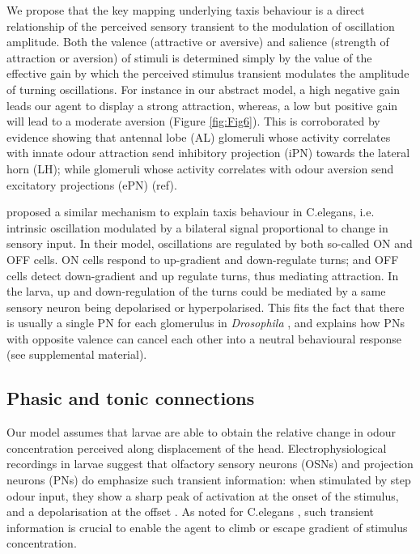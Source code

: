 \documentclass[10pt,a4paper]{article}
\newcommand{\Dros }{\emph{Drosophila }}
\begin{document}
We propose that the key mapping underlying taxis behaviour is a direct relationship of the perceived sensory transient to the modulation of oscillation amplitude.
Both the valence (attractive or aversive) and salience (strength of attraction or aversion) of stimuli is determined simply by the value of the effective gain by which the perceived stimulus transient modulates the amplitude of turning oscillations. For instance in our abstract model, a high negative gain leads our agent to display a strong attraction, whereas, a low but positive gain will lead to a moderate aversion (Figure \ref{fig:Fig6}). This is corroborated by evidence showing that antennal lobe (AL) glomeruli whose activity correlates with innate odour attraction send inhibitory projection (iPN) towards the lateral horn (LH); while glomeruli whose activity correlates with odour aversion send excitatory projections (ePN) (ref). 

 \cite{izquierdo2010evolution} proposed a similar mechanism to explain taxis behaviour in C.elegans, i.e. intrinsic oscillation modulated by a bilateral signal proportional to change in sensory input. In their model, oscillations are regulated by both so-called ON and OFF cells. ON cells respond to up-gradient and down-regulate turns; and OFF cells detect down-gradient and up regulate turns, thus mediating attraction. In the larva, up and down-regulation of the turns could be mediated by a same sensory neuron being depolarised or hyperpolarised. This fits the fact that there is usually a single PN for each glomerulus in \Dros {}, and explains how PNs with opposite valence can cancel each other into a neutral behavioural response (see supplemental material). 
 
  
\subsection{Phasic and tonic connections}
Our model assumes that larvae are able to obtain the relative change in odour concentration perceived along displacement of the head.  Electrophysiological recordings in larvae suggest that olfactory sensory neurons (OSNs) \citep{nagel2011biophysical,schulze2015dynamical} and projection neurons (PNs) do emphasize such transient information: when stimulated by step odour input, they show a sharp peak of activation at the onset of the stimulus, and a depolarisation at the offset \cite{schulze2015dynamical}. As noted for C.elegans \citep{lockery2011computational}, such transient information is crucial to enable the agent to climb or escape gradient of stimulus concentration. 
\end{document}
